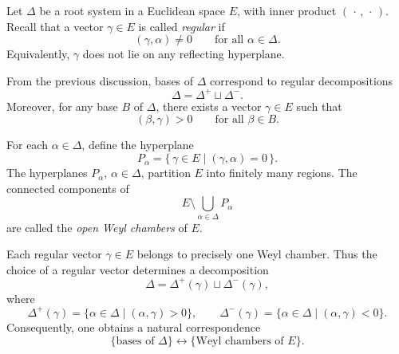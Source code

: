 
Let \(\Delta\) be a root system in a Euclidean space \(E\), with inner product
\((\,\cdot\,,\,\cdot\,)\). Recall that a vector \(\gamma\in E\) is called
\emph{regular} if
\[
    (\gamma,\alpha)\neq 0
    \qquad\text{for all } \alpha\in\Delta .
\]
Equivalently, \(\gamma\) does not lie on any reflecting hyperplane.

From the previous discussion, bases of \(\Delta\) correspond to regular
decompositions
\[
    \Delta=\Delta^+\sqcup\Delta^- .
\]
Moreover, for any base \(B\) of \(\Delta\), there exists a vector
\(\gamma\in E\) such that
\[
    (\beta,\gamma)>0
    \qquad\text{for all } \beta\in B.
\]

\begin{definition}
    For each \(\alpha\in\Delta\), define the hyperplane
    \[
        P_\alpha
        =
        \{\,\gamma\in E\mid (\gamma,\alpha)=0\,\}.
    \]
    The hyperplanes \(P_\alpha\), \(\alpha\in\Delta\), partition \(E\) into
    finitely many regions. The connected components of
    \[
        E\setminus \bigcup_{\alpha\in\Delta} P_\alpha
    \]
    are called the \emph{open Weyl chambers} of \(E\).
\end{definition}

Each regular vector \(\gamma\in E\) belongs to precisely one Weyl chamber.
Thus the choice of a regular vector determines a decomposition
\[
    \Delta=\Delta^+(\gamma)\sqcup\Delta^-(\gamma),
\]
where
\[
    \Delta^+(\gamma)
    =
    \{\alpha\in\Delta\mid (\alpha,\gamma)>0\},
    \qquad
    \Delta^-(\gamma)
    =
    \{\alpha\in\Delta\mid (\alpha,\gamma)<0\}.
\]
Consequently, one obtains a natural correspondence
\[
    \{\text{bases of }\Delta\}
    \longleftrightarrow
    \{\text{Weyl chambers of }E\}.
\]

